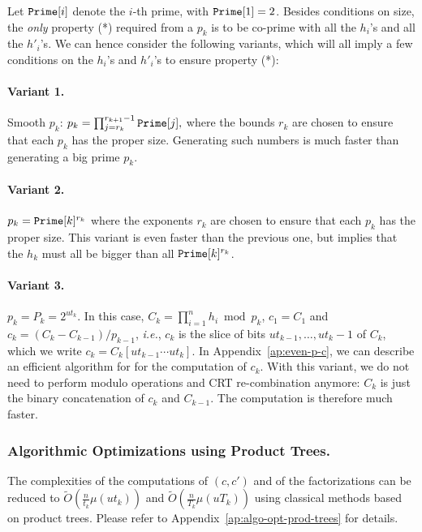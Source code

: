\documentclass[twoside,envcountsame,runningheads]{llncs}
\newcommand{\Oapp}{\ensuremath{\tilde{O}}}
\newcommand{\apref}[1]{Appendix~\ref{#1}}
\newcommand{\apref}[1]{the full version~TODO}
\begin{document}
Let $\mbox{{\tt Prime}}[i]$ denote the $i$-th prime, with $\mbox{{\tt Prime}}[1]=2$. Besides conditions on size, the \textit{only} property (*) required from a $p_k$ is to be co-prime with all the $h_i$'s and all the $h'_i$'s. We can hence consider the following variants, which will all imply a few conditions on the $h_i$'s and $h'_i$'s to ensure property (*):
\paragraph{Variant 1.} Smooth $p_k$:
$ p_k=\prod_{j=r_k}^{r_{k+1}-1} \mbox{{\tt Prime}}[j], $
where the bounds $r_k$ are chosen to ensure that each $p_k$ has the proper size.
Generating such numbers is much faster than generating a big prime $p_k$.

\paragraph{Variant 2.} $p_k=\mbox{{\tt Prime}}[k]^{r_k}$ where the exponents $r_k$ are chosen to ensure that each $p_k$ has the proper size.
This variant is even faster than the previous one, but implies that the $h_k$ must all be bigger than all
$\mbox{{\tt Prime}}[k]^{r_k}$.

\paragraph{Variant 3.} $p_k = P_k = 2^{ut_k}$. 
In this case, $C_k = \prod_{i=1}^n h_i \bmod p_k$, $c_1 = C_1$ and $c_k = (C_k - C_{k-1}) / p_{k-1}$, {\it i.e.}, $c_k$ is the slice of bits $ut_{k-1}, \dots, ut_k-1$ of $C_k$, which we write $c_k = C_k[ut_{k-1}\cdots ut_k]$.
In \apref{ap:even-p-c}, we can describe an efficient algorithm for for the computation of $c_k$. 
With this variant, we do not need to perform modulo operations and CRT re-combination anymore: $C_k$ is just the binary concatenation of $c_k$ and $C_{k-1}$. The computation is therefore much faster.


\subsubsection{Algorithmic Optimizations using Product Trees.}
\label{sec:algo-opt-prod-trees}

The complexities of the computations of $(c,c')$ and of the factorizations can be reduced to $\Oapp(\frac{n}{t_k} \mu(u t_k))$ and $\Oapp(\frac{n}{T_k} \mu(u T_k))$ using classical methods based on product trees. 
Please refer to \apref{ap:algo-opt-prod-trees} for details.
\end{document}
